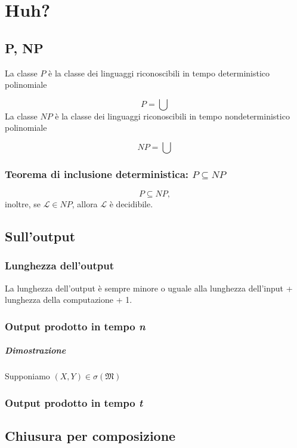 \chapter{Huh?}

\section{P, NP}

La classe $P$ è la classe dei linguaggi riconoscibili in tempo deterministico polinomiale

$$
P = \bigcup
$$
%
La classe $NP$ è la classe dei linguaggi riconoscibili in tempo nondeterministico polinomiale

$$
NP = \bigcup
$$

\subsection{Teorema di inclusione deterministica: $P \subseteq NP$}
$$
P \subseteq NP,
$$
inoltre, se $\mathcal{L} \in NP$, allora $\mathcal L$ è decidibile.

\section{Sull'output}

\subsection{Lunghezza dell'output}

La lunghezza dell'output è sempre minore o uguale alla lunghezza dell'input + lunghezza della computazione + 1.

\subsection{Output prodotto in tempo \textit{n}}
\paragraph{Dimostrazione}
Supponiamo $(X,Y) \in \sigma(\mathfrak{M})$

\subsection{Output prodotto in tempo \textit{t}}

\section{Chiusura per composizione}

